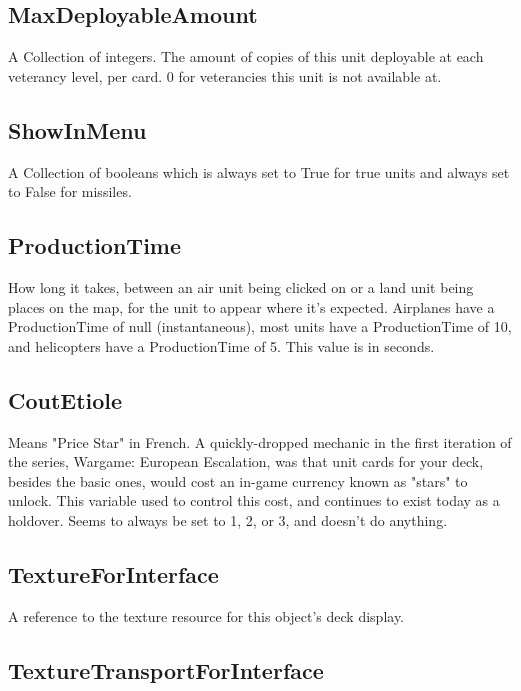 \documentclass{article}
\begin{document}
\subsection{MaxDeployableAmount}

A Collection of integers. The amount of copies of this unit deployable at each veterancy level, per card. 0 for veterancies this unit is not available at.

\subsection{ShowInMenu}

A Collection of booleans which is always set to True for true units and always set to False for missiles.

\subsection{ProductionTime}

How long it takes, between an air unit being clicked on or a land unit being places on the map, for the unit to appear where it's expected. Airplanes have a ProductionTime of null (instantaneous), most units have a ProductionTime of 10, and helicopters have a ProductionTime of 5. This value is in seconds.

\subsection{CoutEtiole}

Means "Price Star" in French. A quickly-dropped mechanic in the first iteration of the series, Wargame: European Escalation, was that unit cards for your deck, besides the basic ones, would cost an in-game currency known as "stars" to unlock. This variable used to control this cost, and continues to exist today as a holdover. Seems to always be set to 1, 2, or 3, and doesn't do anything.

\subsection{TextureForInterface}

A reference to the texture resource for this object's deck display.

\subsection{TextureTransportForInterface}
\end{document}
